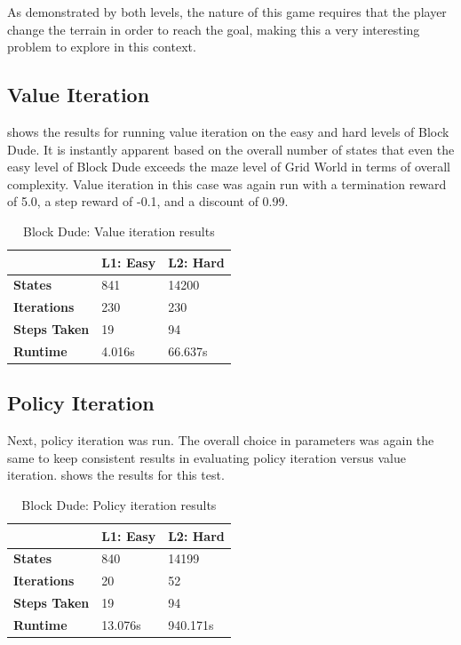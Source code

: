 \documentclass{article}
\begin{document}
      As demonstrated by both levels, the nature of this game requires that the player change the terrain in order to reach the goal, making this a very interesting problem to explore in this context.

    \subsection{Value Iteration}
       shows the results for running value iteration on the easy and hard levels of Block Dude. It is instantly apparent based on the overall number of states that even the easy level of Block Dude exceeds the maze level of Grid World in terms of overall complexity. Value iteration in this case was again run with a termination reward of 5.0, a step reward of -0.1, and a discount of 0.99.

      \begin{table}[h]
      \centering
        \begin{tabular}{|l|l|l|} \hline
          & \textbf{L1: Easy} & \textbf{L2: Hard} \\ \hline
          \textbf{States} & 841 & 14200 \\ \hline
          \textbf{Iterations} & 230 & 230 \\ \hline
          \textbf{Steps Taken} & 19 & 94 \\ \hline
          \textbf{Runtime} & 4.016s & 66.637s \\ \hline
        \end{tabular}

      \caption{Block Dude: Value iteration results}
      \label{tab:bd-vi-results}
      \end{table}

    \subsection{Policy Iteration}
      Next, policy iteration was run. The overall choice in parameters was again the same to keep consistent results in evaluating policy iteration versus value iteration.  shows the results for this test.

      \begin{table}[h]
      \centering
        \begin{tabular}{|l|l|l|} \hline
          & \textbf{L1: Easy} & \textbf{L2: Hard} \\ \hline
          \textbf{States} & 840 & 14199 \\ \hline
          \textbf{Iterations} & 20 & 52 \\ \hline
          \textbf{Steps Taken} & 19 & 94 \\ \hline
          \textbf{Runtime} & 13.076s & 940.171s \\ \hline
        \end{tabular}

      \caption{Block Dude: Policy iteration results}
      \label{tab:bd-pi-results}
      \end{table}
\end{document}
